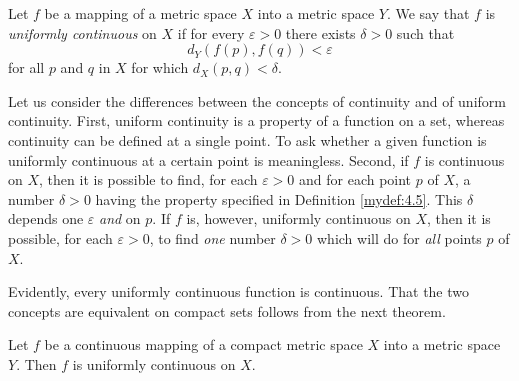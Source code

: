 \begin{mydef}
    \label{mydef:4.18}
    Let $f$ be a mapping of a metric space $X$ into a metric space $Y$.
    We say that $f$ is \emph{uniformly continuous} on $X$
    if for every $\varepsilon > 0$ there exists $\delta > 0$
    such that
    \begin{equation}
        \label{eq:4.15}
        d_Y(f(p),f(q)) < \varepsilon
    \end{equation}
    for all $p$ and $q$ in $X$ for which $d_X(p, q) < \delta$.
\end{mydef}
Let us consider the differences between the concepts of continuity and of
uniform continuity.
First, uniform continuity is a property of a function on a set,
whereas continuity can be defined at a single point.
To ask whether a given function is uniformly continuous at a certain point is meaningless.
Second, if $f$ is continuous on $X$,
then it is possible to find,
for each $\varepsilon > 0$ and for each point $p$ of $X$,
a number $\delta > 0$ having the property specified in Definition \ref{mydef:4.5}.
This $\delta$ depends one $\varepsilon$ \emph{and} on $p$.
If $f$ is, however, uniformly continuous on $X$,
then it is possible, for each $\varepsilon > 0$,
to find \emph{one} number $\delta > 0$ which will do for \emph{all} points $p$ of $X$.

Evidently, every uniformly continuous function is continuous.
That the two concepts are equivalent on compact sets follows from the next theorem.

\begin{thm}
    \label{thm:4.19}
    Let $f$ be a continuous mapping of a compact metric space $X$ into a metric space $Y$.
    Then $f$ is uniformly continuous on $X$.
\end{thm}

